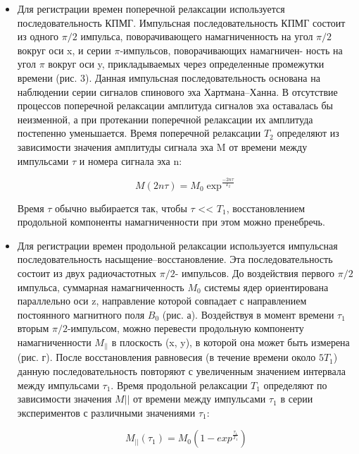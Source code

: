 \documentclass{article}
\begin{document}
 \begin{itemize}

 \item Для регистрации времен поперечной релаксации используется последовательность КПМГ. Импульсная последовательность КПМГ состоит из одного $\pi/2$ импульса, поворачивающего намагниченность на угол $\pi/2$ вокруг оси x, и серии $\pi$-импульсов, поворачивающих намагничен- ность на угол $\pi$ вокруг оси y, прикладываемых через определенные промежутки времени (рис. 3). Данная импульсная последовательность основана на наблюдении серии сигналов спинового эха Хартмана–Ханна. В отсутствие процессов поперечной релаксации амплитуда сигналов эха оставалась бы неизменной, а при протекании поперечной релаксации их амплитуда постепенно уменьшается. Время поперечной релаксации $T_2$ определяют из зависимости значения амплитуды сигнала эха M от времени между импульсами $\tau$ и номера сигнала эха n:
 
 \begin{equation*}
 M(2n\tau) = M_0 \exp^\frac{-2n\tau}{T_2}
\end{equation*}

Время $\tau$ обычно выбирается так, чтобы $\tau$ << $T_1$, восстановлением продольной компоненты намагниченности при этом можно пренебречь.

\item Для регистрации времен продольной релаксации используется импульсная последовательность насыщение–восстановление. Эта последовательность состоит из двух радиочастотных $\pi/2$- импульсов. До воздействия первого $\pi/2$ импульса, суммарная намагниченность $M_0$ системы ядер ориентирована параллельно оси z, направление которой совпадает с направлением постоянного магнитного поля $B_0$ (рис. а). Воздействуя в момент времени $\tau_1$ вторым $\pi/2$-импульсом, можно перевести продольную компоненту намагниченности $M_||$ в плоскость (x, y), в которой она может быть измерена (рис. г). После восстановления равновесия (в течение времени около $5T_1$) данную последовательность повторяют с увеличенным значением интервала между импульсами $\tau_1$. Время продольной релаксации $T_1$ определяют по зависимости значения $M||$ от времени между импульсами $\tau_1$ в серии экспериментов с различными значениями $\tau_1$:

\begin{equation*}
M_||(\tau_1) = M_0( 1 - exp^\frac{\tau_1}{T_1})
\end{equation*}


\end{itemize}
\end{document}
